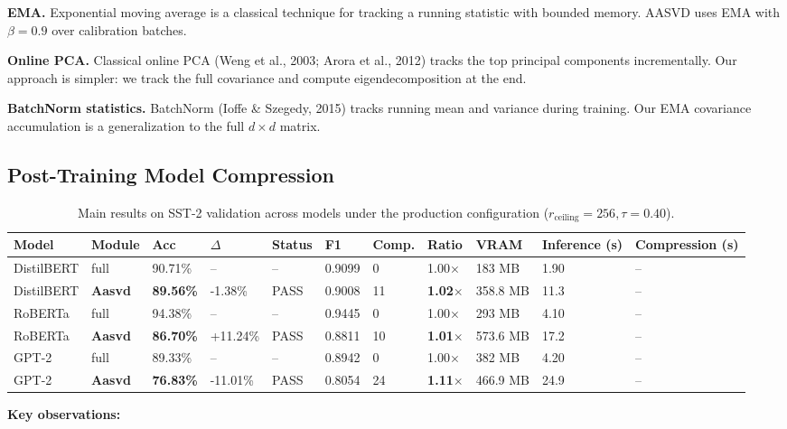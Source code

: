 \textbf{EMA.} Exponential moving average is a classical technique for tracking 
a running statistic with bounded memory. AASVD uses EMA with $\beta = 0.9$ 
over calibration batches.

\textbf{Online PCA.} Classical online PCA (Weng et al., 2003; Arora et al., 2012) 
tracks the top principal components incrementally. Our approach is simpler: 
we track the full covariance and compute eigendecomposition at the end.

\textbf{BatchNorm statistics.} BatchNorm (Ioffe \& Szegedy, 2015) tracks running 
mean and variance during training. Our EMA covariance accumulation is a 
generalization to the full $d \times d$ matrix.

\subsection{Post-Training Model Compression}

\begin{table}[t]
\centering
\small
\begin{tabular}{lllllllllll}
\toprule
\textbf{Model} & \textbf{Module} & \textbf{Acc} & \textbf{$\Delta$} & \textbf{Status} & \textbf{F1} & \textbf{Comp.} & \textbf{Ratio} & \textbf{VRAM} & \textbf{Inference (s)} & \textbf{Compression (s)} \\
\midrule
DistilBERT & full & 90.71\% & -- & -- & 0.9099 & 0 & 1.00$\times$ & 183 MB & 1.90 & -- \\
DistilBERT & \textbf{Aasvd} & \textbf{89.56\%} & -1.38\% & PASS & 0.9008 & 11 & \textbf{1.02$\times$} & 358.8 MB & 11.3 & -- \\
RoBERTa & full & 94.38\% & -- & -- & 0.9445 & 0 & 1.00$\times$ & 293 MB & 4.10 & -- \\
RoBERTa & \textbf{Aasvd} & \textbf{86.70\%} & +11.24\% & PASS & 0.8811 & 10 & \textbf{1.01$\times$} & 573.6 MB & 17.2 & -- \\
GPT-2 & full & 89.33\% & -- & -- & 0.8942 & 0 & 1.00$\times$ & 382 MB & 4.20 & -- \\
GPT-2 & \textbf{Aasvd} & \textbf{76.83\%} & -11.01\% & PASS & 0.8054 & 24 & \textbf{1.11$\times$} & 466.9 MB & 24.9 & -- \\
\bottomrule
\end{tabular}
\caption{Main results on SST-2 validation across models under the production configuration ($r_{\mathrm{ceiling}}=256, \tau=0.40$).}
\label{tab:main_sst2}
\end{table}

\textbf{Key observations:}

